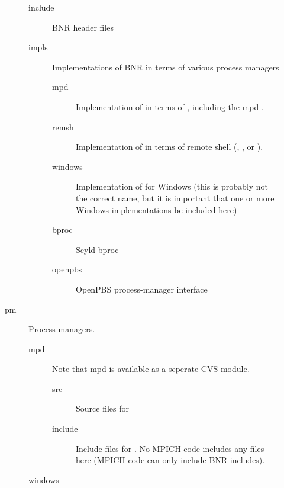 \documentclass{article}
\begin{document}
\begin{description}
\begin{description}
    \begin{description}
      \item[include]BNR header files
      \item[impls]Implementations of BNR in terms of various process managers
      \begin{description}
          \item[mpd]Implementation of  in terms of , 
           including the mpd .  
          \item[remsh]Implementation of  in terms of remote
          shell (, , or ).
          \item[windows]Implementation of  for Windows (this is
          probably not the correct name, but it is important that one or
          more Windows implementations be included here)
          \item[bproc]Scyld bproc
          \item[openpbs]OpenPBS process-manager interface
      \end{description}
    \end{description}
    \item[pm]Process managers.  
        \begin{description}
        \item[mpd]Note that mpd is available as
            a seperate CVS module.
          \begin{description}
          \item[src]Source files for 
          \item[include]Include files for .  No MPICH code includes
           any files here (MPICH code can only include BNR includes).
          \end{description}
        \item[windows]
        \end{description}


\end{description}
\end{description}
\end{document}
